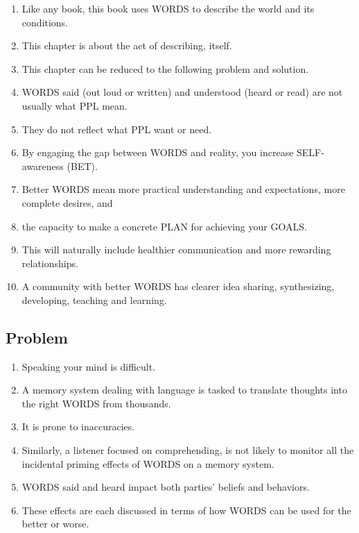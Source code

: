\documentclass[
]{book}
\providecommand{\tightlist}{%
  \setlength{\itemsep}{0pt}\setlength{\parskip}{0pt}}
\begin{document}
\begin{enumerate}
\def\labelenumi{\arabic{enumi}.}
\tightlist
\item
  Like any book, this book uses WORDS to describe the world and its
  conditions.
\item
  This chapter is about the act of describing, itself.
\item
  This chapter can be reduced to the following problem and solution.
\item
  WORDS said (out loud or written) and understood (heard or read) are
  not usually what PPL mean.
\item
  They do not reflect what PPL want or need.
\item
  By engaging the gap between WORDS and reality, you increase SELF-
  awareness (BET).
\item
  Better WORDS mean more practical understanding and expectations,
  more complete desires, and
\item
  the capacity to make a concrete PLAN for achieving your GOALS.
\item
  This will naturally include healthier communication and more
  rewarding relationships.
\item
  A community with better WORDS has clearer idea sharing,
  synthesizing, developing, teaching and learning.
\end{enumerate}

\hypertarget{problem}{%
\subsection{Problem}\label{problem}}

\begin{enumerate}
\def\labelenumi{\arabic{enumi}.}
\setcounter{enumi}{10}
\tightlist
\item
  Speaking your mind is difficult.
\item
  A memory system dealing with language is tasked to translate
  thoughts into the right WORDS from thousands.
\item
  It is prone to inaccuracies.
\item
  Similarly, a listener focused on comprehending, is not likely to monitor
  all the incidental priming effects of WORDS on a memory system.
\item
  WORDS said and heard impact both parties' beliefs and behaviors.
\item
  These effects are each discussed in terms of how WORDS can be used
  for the better or worse.
\end{enumerate}
\end{document}
